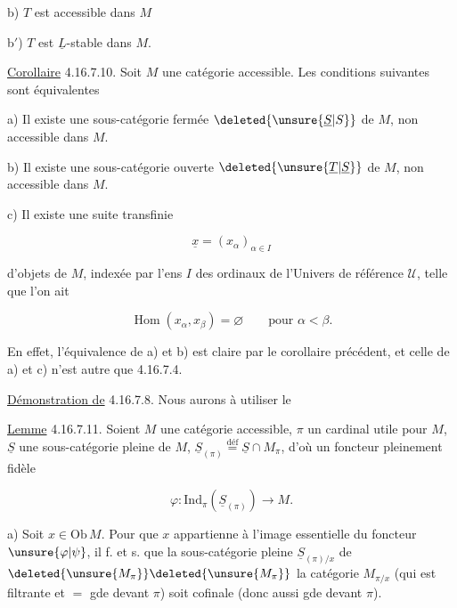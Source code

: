 

b) $T$ est accessible dans $M$

b$'$) $T$ est $\underline L$-stable dans $M$.

\uline{Corollaire} 4.16.7.10. Soit $M$ une catégorie accessible. Les conditions suivantes sont équivalentes

a) Il existe une sous-catégorie fermée $\deleted{\unsure{\underline S|S}}$ de $M$, non accessible dans $M$.

b) Il existe une sous-catégorie ouverte $\deleted{\unsure{\underline T|\underline S}}$ de $M$, non accessible dans $M$.


c) Il existe une suite transfinie 

\[\underline x=(x_\alpha)_{\alpha\in I}\]

d'objets de $M$, indexée par l'ens $I$ des ordinaux de l'Univers de référence $\mathcal U$, telle que l'on ait

\[\operatorname{Hom}(x_\alpha,x_\beta)=\varnothing\qquad\text{pour }\alpha<\beta .\]

En effet, l'équivalence de a) et b) est claire par le corollaire précédent,  et celle de a) et c) n'est autre que 4.16.7.4.

\uline{Démonstration de} 4.16.7.8. Nous aurons à utiliser le

\uline{Lemme} 4.16.7.11. Soient $M$ une catégorie accessible, $\pi$ un cardinal utile pour $M$, $\underline S$ une sous-catégorie pleine de $M$, $\underline S_{(\pi)}\overset{\mathrm{déf}}{=}\underline S\cap M_\pi$, d'où un foncteur pleinement fidèle

\[\varphi:\mathrm{Ind}_\pi(\underline S_{(\pi)})\longrightarrow M .\]



a) Soit $x\in\mathrm{Ob}\,M$. Pour que $x$ appartienne à l'image essentielle du foncteur $\unsure{\varphi|\psi}$, il f. et s. que la sous-catégorie pleine $\underline S_{(\pi)/x}$ de $\deleted{\unsure{M_\pi}}\deleted{\unsure{M_\pi}}$ la catégorie $M_{\pi/x}$ (qui est filtrante et $=$ gde devant $\pi$) soit cofinale (donc aussi gde devant $\pi$).

